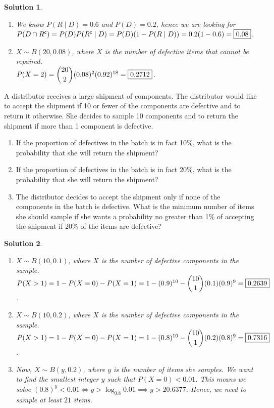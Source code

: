 \documentclass[11pt]{article}
\newtheorem*{solution}{Solution}
\theoremstyle{mystyle}
\renewcommand{\|}{\mid}
\begin{document}
\begin{solution}
    \leavevmode
    \begin{enumerate}[label=\alph*.]
        \item We know $P(R\|D)=0.6$ and $P(D)=0.2$, hence we are looking for $P(D \intersect R^{\mathsf{c}}) = P(D)P(R^{\mathsf{c}}\|D) 
        = P(D)(1-P(R\|D))= 0.2(1-0.6) = \boxed{0.08}$.
        \item $X \sim B(20,0.08)$, where $X$ is the number of defective items that cannot be repaired.
        \\ $P(X=2)=\dbinom{20}{2} (0.08)^2 (0.92)^{18} = \boxed{0.2712}$.
    \end{enumerate}
\end{solution}

\begin{psproblem}{}{}
    A distributor receives a large shipment of components. The distributor would like to accept the shipment if 10
    or fewer of the components are defective and to return it otherwise. She decides to sample 10 components and to
    return the shipment if more than 1 component is defective.
    \begin{enumerate}[label=\alph*.]
        \item If the proportion of defectives in the batch is in fact 10\%, what is the probability that she will return the
        shipment?
        \item If the proportion of defectives in the batch is in fact 20\%, what is the probability that she will return the
        shipment?
        \item The distributor decides to accept the shipment only if none of the components in the batch is defective. What
        is the minimum number of items she should sample if she wants a probability no greater than 1\% of accepting
        the shipment if 20\% of the items are defective?
    \end{enumerate}
\end{psproblem}

\begin{solution}
    \leavevmode
    \begin{enumerate}[label=\alph*.]
        \item $X \sim B(10,0.1)$, where $X$ is the number of defective components in the sample.
        \\ $P(X>1)=1-P(X=0)-P(X=1)=1-(0.9)^{10}-\dbinom{10}{1}(0.1)(0.9)^9 = \boxed{0.2639}$.
        \item $X \sim B(10,0.2)$, where $X$ is the number of defective components in the sample.
        \\ $P(X>1)=1-P(X=0)-P(X=1)=1-(0.8)^{10}-\dbinom{10}{1}(0.2)(0.8)^9 = \boxed{0.7316}$.
        \item Now, $X \sim B(y,0.2)$, where $y$ is the number of items she samples. We want to find
        the smallest integer $y$ such that $P(X=0) < 0.01$.
        This means we solve $(0.8)^y < 0.01 \iff y>\log_{0.8}0.01 \implies y>20.6377$.
        Hence, we need to sample at least $\boxed{21}$ items.
    \end{enumerate}
\end{solution}
\end{document}
